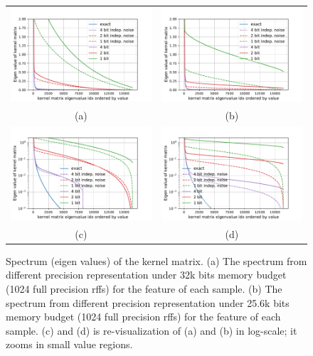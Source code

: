 \begin{figure}
	\centering
	\begin{tabular}{c c}
		\includegraphics[width=.45\linewidth]{figures/spectrum_1024_indep.pdf} &
		\includegraphics[width=.45\linewidth]{figures/spectrum_8192_indep.pdf} \\
		(a) & (b) \\
		\includegraphics[width=.45\linewidth]{figures/spectrum_1024_indep_log.pdf} &
		\includegraphics[width=.45\linewidth]{figures/spectrum_8192_indep_log.pdf} \\
		(c) & (d)
	\end{tabular}
	\caption{Spectrum (eigen values) of the kernel matrix. (a) The spectrum from different precision representation under 32k bits memory budget (1024 full precision rffs) for the feature of each sample. (b) The spectrum from different precision representation under 25.6k bits memory budget (1024 full precision rffs) for the feature of each sample. (c) and (d) is re-visualization of (a) and (b) in log-scale; it zooms in small value regions.}
	\label{fig:indep_quant}
\end{figure}


